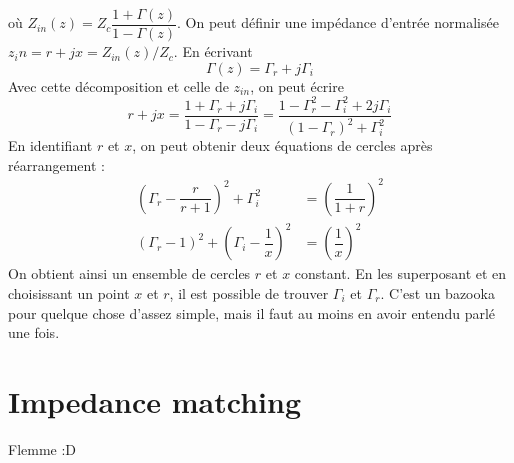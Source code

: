 où $Z_{in}(z) = Z_c\dfrac{1+\Gamma(z)}{1-\Gamma(z)}$. On peut définir une impédance d'entrée 
normalisée $z_in = r+jx = Z_{in}(z)/Z_c$. En écrivant
\begin{equation}
\Gamma(z) = \Gamma_r + j\Gamma_i
\end{equation}
Avec cette décomposition et celle de $z_{in}$, on peut écrire
\begin{equation}
r+jx = \dfrac{1+\Gamma_r+j\Gamma_i}{1-\Gamma_r-j\Gamma_i} = \dfrac{1-\Gamma_r^2-\Gamma_i^2+2j
\Gamma_i}{(1-\Gamma_r)^2+\Gamma_i^2}
\end{equation}
En identifiant $r$ et $x$, on peut obtenir deux équations de cercles après réarrangement :
\begin{equation}
\begin{array}{ll}
\left(\Gamma_r -\dfrac{r}{r+1}\right)^2 + \Gamma_i^2 &= \left(\dfrac{1}{1+r}\right)^2\\
(\Gamma_r-1)^2 +\left(\Gamma_i-\dfrac{1}{x}\right)^2 &= \left(\dfrac{1}{x}\right)^2
\end{array}
\end{equation}
On obtient ainsi un ensemble de cercles $r$ et $x$ constant. En les superposant et en 
choisissant un point $x$ et $r$, il est possible de trouver $\Gamma_i$ et $\Gamma_r$. C'est 
un bazooka pour quelque chose d'assez simple, mais il faut au moins en avoir entendu 
parlé une fois.

\section{Impedance matching}
Flemme :D
	
	
	
	
	
	
	
	
	
	
	
	
	
	
	
	
	
	
	
	
	
	
	
	
	



